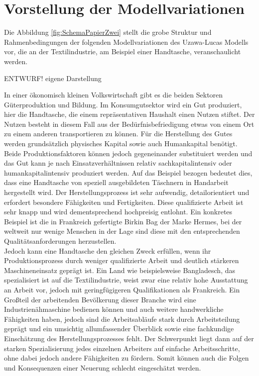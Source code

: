 \section[Vorstellung der Modellvariationen]{Vorstellung der Modellvariationen}
Die Abbildung \ref{fig:SchemaPapierZwei} stellt die grobe Struktur und Rahmenbedingungen der folgenden Modellvariationen des Uzawa-Lucas Modells vor, die an der Textilindustrie, am Beispiel einer Handtasche, veranschaulicht werden.\\
%
\begin{figure*}[htbp]
	\centering
	\hfill{}  ENTWURF! eigene Darstellung
	\caption{Kategorisierung der Entwicklungsstufen}
	\label{fig:SchemaPapierZwei}		
\end{figure*}
%
In einer ökonomisch kleinen Volkswirtschaft gibt es die beiden Sektoren Güterproduktion und Bildung. Im Konsumgutsektor wird ein Gut produziert, hier die Handtasche, die einem repräsentativen Haushalt einen Nutzen stiftet. Der Nutzen besteht in diesem Fall aus der Bedürfnisbefriedigung etwas von einem Ort zu einem anderen transportieren zu können. Für die Herstellung des Gutes werden grundsätzlich physisches Kapital sowie auch Humankapital benötigt. Beide Produktionsfaktoren können jedoch gegeneinander substituiert werden und das Gut kann je nach Einsatzverhältnissen relativ sachkapitalintensiv oder humankapitalintensiv produziert werden. Auf das Beispiel bezogen bedeutet dies, dass eine Handtasche von speziell ausgebildeten Täschnern in Handarbeit hergestellt wird. Der Herstellungsprozess ist sehr aufwendig, detailorientiert und erfordert besondere Fähigkeiten und Fertigkeiten. Diese qualifizierte Arbeit ist sehr knapp und wird dementsprechend hochpreisig entlohnt. Ein konkretes Beispiel ist die in Frankreich gefertigte Birkin Bag der Marke Hermes, bei der weltweit nur wenige Menschen in der Lage sind diese mit den entsprechenden Qualitätsanforderungen herzustellen.\\
%
Jedoch kann eine Handtasche den gleichen Zweck erfüllen, wenn ihr Produktionsprozess durch weniger qualifizierte Arbeit und deutlich stärkeren Maschineneinsatz geprägt ist.
Ein Land wie beispielsweise Bangladesch, das spezialisiert ist auf die Textilindustrie, weist zwar eine relativ hohe Ausstattung an Arbeit vor, jedoch mit geringfügigeren Qualifikationen als Frankreich. Ein Großteil der arbeitenden Bevölkerung dieser Branche wird eine Industrienähmaschine bedienen können und auch weitere handwerkliche Fähigkeiten haben, jedoch sind die Arbeitsabläufe stark durch Arbeitsteilung geprägt und ein umsichtig allumfassender Überblick sowie eine fachkundige Einschätzung des Herstellungsprozesses fehlt. Der Schwerpunkt liegt dann auf der starken Spezialisierung jedes einzelnen Arbeiters auf einfache Arbeitsschritte, ohne dabei jedoch andere Fähigkeiten zu fördern. Somit können auch die Folgen und Konsequenzen einer Neuerung schlecht eingeschätzt werden. 

